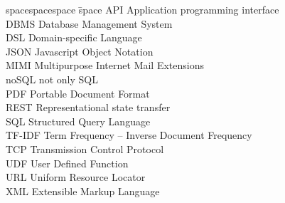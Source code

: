 
\begin{tabbing}
spacespacespace \= space \kill
API		\>	Application programming interface \\
DBMS	\>	Database Management System \\
DSL		\>	Domain-specific Language \\
JSON	\>	Javascript Object Notation \\
MIMI	\>	Multipurpose Internet Mail Extensions \\
noSQL	\> 	not only SQL \\
PDF		\> 	Portable Document Format \\
REST	\> 	Representational state transfer \\
SQL		\> 	Structured Query Language \\
TF-IDF	\> 	Term Frequency – Inverse Document Frequency \\
TCP		\> 	Transmission Control Protocol \\
UDF		\> 	User Defined Function \\
URL		\>  Uniform Resource Locator \\
XML		\>	Extensible Markup Language \\

\end{tabbing}
\endinput
